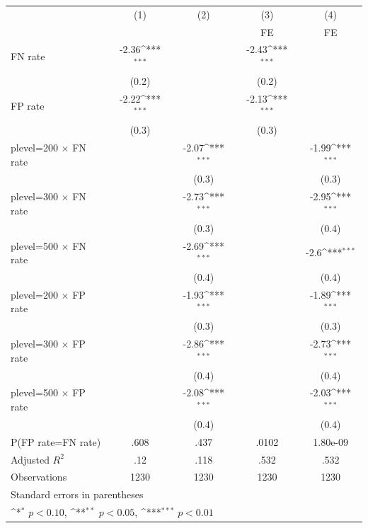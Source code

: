 {
\def\sym#1{\ifmmode^{#1}\else\(^{#1}\)\fi}
\begin{tabular}{l*{4}{c}}
\hline\hline
                &\multicolumn{1}{c}{(1)}&\multicolumn{1}{c}{(2)}&\multicolumn{1}{c}{(3)}&\multicolumn{1}{c}{(4)}\\
                &\multicolumn{1}{c}{}&\multicolumn{1}{c}{}&\multicolumn{1}{c}{FE}&\multicolumn{1}{c}{FE}\\
\hline
FN rate         &    -2.36\sym{***}&                  &    -2.43\sym{***}&                  \\
                &    (0.2)         &                  &    (0.2)         &                  \\
FP rate         &    -2.22\sym{***}&                  &    -2.13\sym{***}&                  \\
                &    (0.3)         &                  &    (0.3)         &                  \\
plevel=200 $\times$ FN rate&                  &    -2.07\sym{***}&                  &    -1.99\sym{***}\\
                &                  &    (0.3)         &                  &    (0.3)         \\
plevel=300 $\times$ FN rate&                  &    -2.73\sym{***}&                  &    -2.95\sym{***}\\
                &                  &    (0.3)         &                  &    (0.4)         \\
plevel=500 $\times$ FN rate&                  &    -2.69\sym{***}&                  &     -2.6\sym{***}\\
                &                  &    (0.4)         &                  &    (0.4)         \\
plevel=200 $\times$ FP rate&                  &    -1.93\sym{***}&                  &    -1.89\sym{***}\\
                &                  &    (0.3)         &                  &    (0.3)         \\
plevel=300 $\times$ FP rate&                  &    -2.86\sym{***}&                  &    -2.73\sym{***}\\
                &                  &    (0.4)         &                  &    (0.4)         \\
plevel=500 $\times$ FP rate&                  &    -2.08\sym{***}&                  &    -2.03\sym{***}\\
                &                  &    (0.4)         &                  &    (0.4)         \\
\hline
P(FP rate=FN rate)&     .608         &     .437         &    .0102         & 1.80e-09         \\
Adjusted \(R^{2}\)&      .12         &     .118         &     .532         &     .532         \\
Observations    &     1230         &     1230         &     1230         &     1230         \\
\hline\hline
\multicolumn{5}{l}{\footnotesize Standard errors in parentheses}\\
\multicolumn{5}{l}{\footnotesize \sym{*} \(p<0.10\), \sym{**} \(p<0.05\), \sym{***} \(p<0.01\)}\\
\end{tabular}
}
